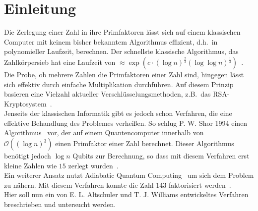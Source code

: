 \chapter{Einleitung}
Die Zerlegung einer Zahl in ihre Primfaktoren lässt sich auf einem klassischen Computer mit keinem bisher bekanntem Algorithmus effizient, d.h.\ in polynomieller Laufzeit, berechnen. Der schnellste klassische Algorithmus, das Zahlkörpersieb hat eine Laufzeit von $\approx\exp\left(c\cdot{\left(\log n\right)}^\frac{2}{3}{\left(\log\log n\right)}^\frac{1}{3}\right)$~\parencite{pomerance}.\\
Die Probe, ob mehrere Zahlen die Primfaktoren einer Zahl sind, hingegen lässt sich effektiv durch einfache Multiplikation durchführen. Auf diesem Prinzip basieren eine Vielzahl aktueller Verschlüsselungsmethoden, z.B.\ das RSA-Kryptosystem~\parencite{rsa}. \\
Jenseits der klassischen Informatik gibt es jedoch schon Verfahren, die eine effektive Behandlung des Problemes verheißen. So schlug P. W. Shor 1994 einen Algorithmus~\parencite{shor} vor, der auf einem Quantencomputer innerhalb von $\mathcal{O}\left({\left(\log n\right)}^3\right)$ einen Primfaktor einer Zahl berechnet. Dieser Algorithmus benötigt jedoch $\log n$ Qubits zur Berechnung, so dass mit diesem Verfahren erst kleine Zahlen wie $15$ zerlegt wurden~\parencite{vandersypen}.\\
Ein weiterer Ansatz nutzt Adiabatic Quantum Computing~\parencite{suter} um sich dem Problem zu nähern. Mit diesem Verfahren konnte die Zahl $143$ faktorisiert werden~\parencite{xu}. \\
Hier soll nun ein von E. L. Altschuler und T. J. Williams entwickeltes Verfahren~\parencite{altschuler} breschrieben und untersucht werden.

